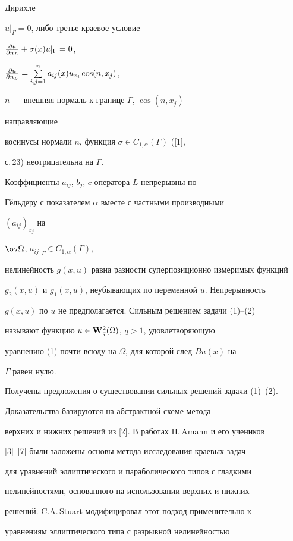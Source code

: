 Дирихле 


$u|_\Gamma=0$, либо третье краевое условие 


$\frac{\partial u}{\partial n_L}+\sigma(x)u|_\Gamma=0$, 


$\frac{\partial u}{\partial n_L}=\sum\limits^n_{i,j=1}a_{ij}(x)u_{x_i}\cos(n,x_j)$, 


$n$ --- внешняя нормаль к границе $\Gamma$, $\cos(n,x_j)$ --- 


направляющие 


косинусы нормали $n$, функция $\sigma\in C_{1,\alpha}(\Gamma)$ ([1],


с.\,23) неотрицательна на $\Gamma$. 


Коэффициенты $a_{ij}$, $b_j$, $c$ оператора $L$ непрерывны по 


Г\"ельдеру с показателем $\alpha$ вместе с частными производными 


$(a_{ij})_{x_j}$ на 


$\ov\Omega$, $a_{ij}|_\Gamma\in C_{1,\alpha}(\Gamma)$, 


нелинейность $g(x,u)$ равна разности суперпозиционно измеримых функций 


$g_2(x,u)$ и $g_1(x,u)$, неубывающих по переменной $u$. Непрерывность 


$g(x,u)$ по $u$ не предполагается. Сильным решением задачи (1)--(2) 


называют функцию $u\in\bold W^2_q(\Omega)$, $q>1$, удовлетворяющую 


уравнению (1) почти всюду на $\Omega$, для которой след $Bu(x)$ на 


$\Gamma$ равен нулю. 


 


Получены предложения о существовании сильных решений задачи (1)--(2). 


Доказательства базируются на абстрактной схеме метода 


верхних и нижних решений из [2]. В работах H.\,Amann и его учеников 


[3]--[7] были заложены основы метода исследования краевых задач 


для уравнений эллиптического и параболического типов с гладкими 


нелинейностями, основанного на использовании верхних и нижних 


решений. C.A.\,Stuart модифицировал этот подход применительно к 


уравнениям эллиптического типа с разрывной нелинейностью 


